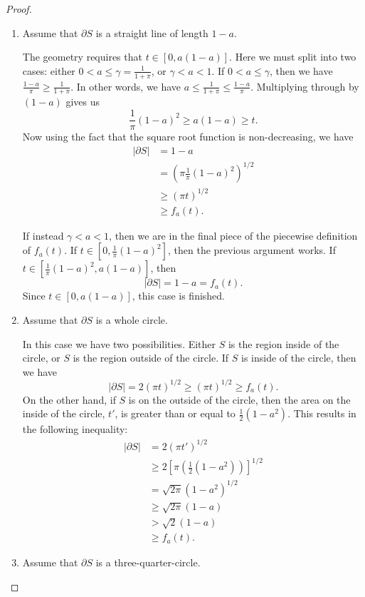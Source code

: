 \documentclass[leqno]{article}
\numberwithin{equation}{section}
\theoremstyle{definition}
\theoremstyle{remark}
\theoremstyle{plain}
\begin{document}
{\begin{proof}
\begin{enumerate}
        From Lemma \ref{lem:maxf_a}, $f_a(t) \leq 1$. Thus, we have
        \[
            |\partial S| = 1 \geq f_a(t).
        \]
        
        \item Assume that $\partial S$ is a straight line of length $1-a$.

        The geometry requires that $t \in [0,a(1-a)]$. Here we must split into two cases: either $0 < a \leq \gamma = \frac{1}{1+\pi}$, or $\gamma < a < 1$. If $0 < a \leq \gamma$, then we have $\frac{1-a}{\pi} \geq \frac{1}{1+\pi}$. In other words, we have $a \leq \frac{1}{1+\pi} \leq \frac{1-a}{\pi}$. Multiplying through by $(1-a)$ gives us
        \[
            \frac{1}{\pi}(1-a)^2 \geq a(1-a) \geq t.
        \]
        Now using the fact that the square root function is non-decreasing, we have
        \begin{align*}
            |\partial S| &= 1-a \\
            &= \left(\pi \frac{1}{\pi}(1-a)^2\right)^{1/2} \\
            &\geq (\pi t)^{1/2} \\
            &\geq f_a(t).
        \end{align*}

        If instead $\gamma < a < 1$, then we are in the final piece of the piecewise definition of $f_a(t)$. If $t \in \left[0,\frac{1}{\pi}(1-a)^2\right]$, then the previous argument works. If $t \in \left[\frac{1}{\pi}(1-a)^2,a(1-a)\right]$, then
        \[
            |\partial S| = 1-a = f_a(t).
        \]
        Since $t \in \left[0, a(1-a)\right]$, this case is finished.
        \item Assume that $\partial S$ is a whole circle.

        In this case we have two possibilities. Either $S$ is the region inside of the circle, or $S$ is the region outside of the circle. If $S$ is inside of the circle, then we have
        \[
            |\partial S| = 2(\pi t)^{1/2} \geq (\pi t)^{1/2} \geq f_a(t).
        \]
        On the other hand, if $S$ is on the outside of the circle, then the area on the inside of the circle, $t'$, is greater than or equal to $\frac{1}{2}(1-a^2)$. This results in the following inequality:
        \begin{align*}
            |\partial S| &= 2(\pi t')^{1/2} \\
            &\geq 2\left[\pi \left(\frac{1}{2}(1-a^2)\right)\right]^{1/2} \\
            &= \sqrt{2\pi}(1-a^2)^{1/2} \\
            &\geq \sqrt{2\pi}(1-a) \\
            &> \sqrt{2}(1-a) \\
            &\geq f_a(t).
        \end{align*}
        \item Assume that $\partial S$ is a three-quarter-circle.


\end{enumerate}
\end{proof}}
\end{document}
